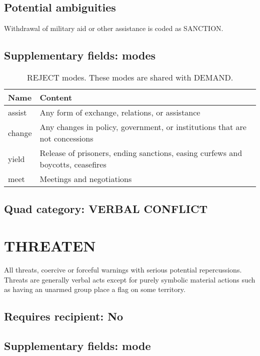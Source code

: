\documentclass[11pt]{report}
\newcommand{\plcat}[1]{\textsf{#1}}
\begin{document}
\subsection{Potential ambiguities}

Withdrawal of military aid or other assistance is coded as \plcat{SANCTION}.


\subsection{Supplementary fields: modes}

\begin{table}[htp]
\caption{\plcat{REJECT} modes. These modes are shared with \plcat{DEMAND}.}
\begin{center}
\begin{tabular}{|l|p{13cm}|}
\hline
Name & Content \\
\hline
assist & Any form of exchange, relations, or assistance\\
change & Any changes in policy, government, or institutions that are not concessions \\
yield & Release of prisoners, ending sanctions, easing curfews and boycotts, ceasefires\\
meet & Meetings and negotiations\\
\hline
\end{tabular}
\end{center}
\label{tab:rejectmode}
\end{table}%


\subsection{Quad category: VERBAL CONFLICT}

\newpage


\section{THREATEN}

All threats, coercive or forceful warnings with serious potential repercussions. Threats are generally verbal acts except for purely symbolic material actions such as having an unarmed group place a flag on some territory.
\subsection{Requires recipient: No}

\subsection{Supplementary fields: mode}
\end{document}

